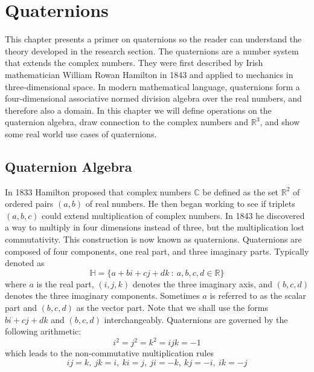 \chapter{Quaternions}
This chapter presents a primer on quaternions so the reader can understand the theory developed in the research section.
The quaternions are a number system that extends the complex numbers. 
They were first described by Irish mathematician William Rowan Hamilton in 1843 and applied to mechanics in three-dimensional space. 
In modern mathematical language, quaternions form a four-dimensional associative normed division algebra over the real numbers, and therefore also a domain.
In this chapter we will define operations on the quaternion algebra, draw connection to the complex numbers and $\mathbb{R}^3$, and show some real world use cases of quaternions.


\section{Quaternion Algebra}\label{s:quatalg}
In 1833 Hamilton proposed that complex numbers $\mathbb{C}$ be defined as the set $\mathbb{R}^2$ of ordered pairs $(a, b)$ of real numbers.
He then began working to see if triplets $(a,b,c)$ could extend multiplication of complex numbers.
In 1843 he discovered a way to multiply in four dimensions instead of three, but the multiplication lost commutativity.
This construction is now known as quaternions.
Quaternions are composed of four components, one real part, and three imaginary parts.
Typically denoted as
\begin{equation}
\mathbb{H} = \{a + b\textit{i} + c\textit{j} + d\textit{k}~:~a,b,c,d \in \mathbb{R}\}
\label{eq:quaternion1}
\end{equation}
where $a$ is the real part, $(i,j,k)$ denotes the three imaginary axis, and $(b,c,d)$ denotes the three imaginary components.
Sometimes $a$ is referred to as the scalar part and $(b,c,d)$ as the vector part.
Note that we shall use the forms $bi + cj + dk$ and $(b,c,d)$ interchangeably.
Quaternions are governed by the following arithmetic:
\begin{equation}
i^2=j^2=k^2=ijk=-1
\label{eq:quarternion2}
\end{equation}
which leads to the non-commutative multiplication rules
\begin{equation}
ij=k,~jk=i,~ki=j,~ji=-k,~kj=-i,~ik=-j
\label{eq:quarternion3}
\end{equation}


